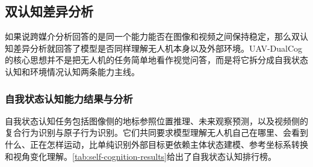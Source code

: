 \FloatBarrier
\subsection{双认知差异分析}

如果说跨媒介分析回答的是同一个能力能否在图像和视频之间保持稳定，那么双认知差异分析就回答了模型是否同样理解无人机本身以及外部环境。UAV-DualCog 的核心思想并不是把无人机的任务简单地看作视觉问答，而是将它拆分成自我状态认知和环境情况认知两条能力主线。

\subsubsection{自我状态认知能力结果与分析}

自我状态认知任务包括图像侧的地标参照位置推理、未来观察预测，以及视频侧的复合行为识别与原子行为识别。它们共同要求模型理解无人机自己在哪里、会看到什么、正在怎样运动，比单纯识别外部目标更依赖主体状态建模、参考坐标系转换和视角变化理解。\autoref{tab:self-cognition-results}给出了自我状态认知排行榜。

